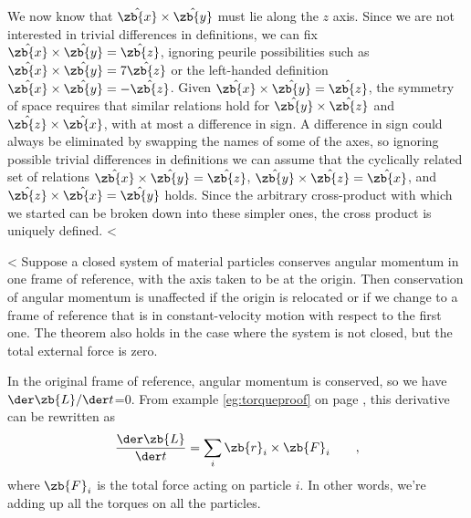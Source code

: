 We now know that $\hat{\zb{x}}\times\hat{\zb{y}}$
 must lie along the $z$ axis. Since we are
not interested in trivial differences in definitions, we can
fix $\hat{\zb{x}}\times\hat{\zb{y}}=\hat{\zb{z}}$,
ignoring peurile possibilities such as
$\hat{\zb{x}}\times\hat{\zb{y}}=7\hat{\zb{z}}$ or the
left-handed definition $\hat{\zb{x}}\times\hat{\zb{y}}=-\hat{\zb{z}}$.
Given $\hat{\zb{x}}\times\hat{\zb{y}}=\hat{\zb{z}}$, the symmetry of space
requires that similar relations hold for $\hat{\zb{y}}\times\hat{\zb{z}}$ and
$\hat{\zb{z}}\times\hat{\zb{x}}$, with at most
a difference in sign. A difference in sign could always be
eliminated by swapping the names of some of the axes, so
ignoring possible trivial differences in definitions we can
assume that the cyclically related set of relations  $\hat{\zb{x}}\times\hat{\zb{y}}=\hat{\zb{z}}$,
 $\hat{\zb{y}}\times\hat{\zb{z}}=\hat{\zb{x}}$, and  $\hat{\zb{z}}\times\hat{\zb{x}}=\hat{\zb{y}}$
holds. Since the arbitrary cross-product with which we
started can be broken down into these simpler ones, the
cross product is uniquely defined.
<%

<%
 Suppose a closed system of material particles conserves
angular momentum in one frame of reference, with the axis taken to be
at the origin. Then conservation of angular momentum is unaffected if the origin
is relocated or if we change to a frame of reference that is in constant-velocity
motion with respect to the first one. The theorem also holds in the case where the system is not
closed, but the total external force is zero.\label{choiceofaxisproof}

 In the original frame of reference, angular momentum is
conserved, so we have $\der\zb{L}/\der t$=0.
From example \ref{eg:torqueproof} on page \pageref{eg:torqueproof}, this
derivative can be rewritten as
\begin{equation*}
		\frac{\der\zb{L}}{\der t}	= \sum_i  \zb{r}_i\times\zb{F}_i \qquad ,
\end{equation*}
where $\zb{F}_i$ is the total force acting on particle $i$. In other words, we're
adding up all the torques on all the particles. 

